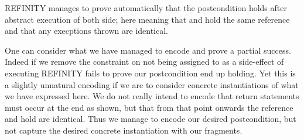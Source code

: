 REFINITY manages to prove automatically that the postcondition holds after abstract execution of both side; here meaning that
 and  hold the same reference and that any execptions thrown are identical.

One can consider what we have managed to encode and prove a partial success.
Indeed if we remove the constraint on  not being assigned to as a side-effect of executing   REFINITY fails to prove our postcondition end up holding.
Yet this is a slightly unnatural encoding if we are to consider concrete instantiations of what we have expressed here.
We do not really intend to encode that return statements must occur at the end as shown, but that from that point onwards the reference  and  hold
are identical. Thus we manage to encode our desired postcondition, but not capture the desired concrete instantiation with our fragments.

